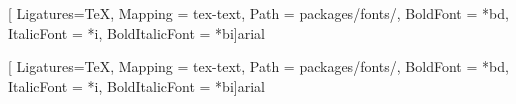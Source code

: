 
\newcommand{\@icmcFont}[2][]{\fontsize{#2}{#2}\ifthenelse{\isempty{#1}}{}{\fontspec[Mapping = tex-text, Path = packages/fonts/]{#1}}}

\ifxetex %
\RequirePackage{fontspec}
\RequirePackage{xltxtra}
\newfontfamily{\arial}[
Ligatures=TeX, %
Mapping         = tex-text,
Path            = packages/fonts/,
BoldFont        = *bd,
ItalicFont      = *i,
BoldItalicFont  = *bi]{arial}

\newcommand\@icmcTitulo{\@icmcFont{18}\arial}
\newcommand\@icmcAutorCapa{\@icmcFont{13}\arial\bfseries\itshape}
\newcommand\@icmcAutorFolhaRosto{\@icmcFont{13}\arial\bfseries}
\newcommand\@icmcTituloFolhaRosto{\@icmcFont{17}\arial}
\newcommand\@icmcOrientador{\@icmcFont{10}\arial}
\newcommand\@icmcPreambulo{\@icmcFont{10}\arial}
\newcommand\@icmcLocalData{\@icmcFont{11}\arial\bfseries}
\newcommand\@icmcCarimbo{\@icmcFont{11}\arial}
\newcommand\@icmcSVPG{\@icmcFont{8}\arial}
\else
\ifluatex %
\RequirePackage{fontspec}
\newfontfamily{\arial}[
Ligatures=TeX, %
Mapping         = tex-text,
Path            = packages/fonts/,
BoldFont        = *bd,
ItalicFont      = *i,
BoldItalicFont  = *bi]{arial}

\newcommand\@icmcTitulo{\@icmcFont{18}\arial}
\newcommand\@icmcAutorCapa{\@icmcFont{13}\arial\bfseries\itshape}
\newcommand\@icmcAutorFolhaRosto{\@icmcFont{13}\arial\bfseries}
\newcommand\@icmcTituloFolhaRosto{\@icmcFont{17}\arial}
\newcommand\@icmcOrientador{\@icmcFont{10}\arial}
\newcommand\@icmcPreambulo{\@icmcFont{10}\arial}
\newcommand\@icmcLocalData{\@icmcFont{11}\arial\bfseries}
\newcommand\@icmcCarimbo{\@icmcFont{11}\arial}
\newcommand\@icmcSVPG{\@icmcFont{8}\arial}

\else %
\RequirePackage[T1]{fontenc}	    	%
\RequirePackage[utf8]{inputenc}		%
\newcommand\@icmcTitulo{\fontsize{18pt}{1em}\selectfont\usefont{T1}{phv}{m}{n}}
\newcommand\@icmcAutorCapa{\fontsize{13pt}{1em}\selectfont\usefont{T1}{phv}{b}{it}}
\newcommand\@icmcAutorFolhaRosto{\fontsize{13pt}{1em}\selectfont\usefont{T1}{phv}{b}{n}}
\newcommand\@icmcTituloFolhaRosto{\fontsize{17pt}{1em}\selectfont\usefont{T1}{phv}{m}{n}}
\newcommand\@icmcOrientador{\fontsize{10pt}{1em}\selectfont\usefont{T1}{phv}{m}{n}}
\newcommand\@icmcPreambulo{\fontsize{10pt}{1em}\selectfont\usefont{T1}{phv}{m}{n}}
\newcommand\@icmcLocalData{\fontsize{11pt}{1em}\selectfont\usefont{T1}{phv}{b}{n}}
\newcommand\@icmcCarimbo{\fontsize{11pt}{1em}\selectfont\usefont{T1}{phv}{m}{n}}
\newcommand\@icmcSVPG{\fontsize{8pt}{1em}\selectfont\usefont{T1}{phv}{m}{n}}
\fi
\fi